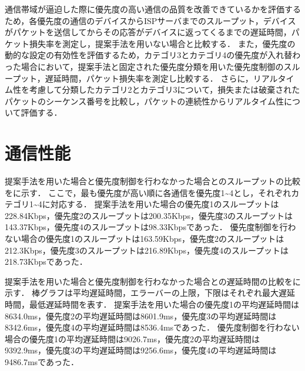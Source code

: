 \documentclass[a4paper,11pt,uplatex]{ujreport}
\begin{document}
  通信帯域が逼迫した際に優先度の高い通信の品質を改善できているかを評価するため，各優先度の通信のデバイスからISPサーバまでのスループット，デバイスがパケットを送信してからその応答がデバイスに返ってくるまでの遅延時間，パケット損失率を測定し，提案手法を用いない場合と比較する．
  また，優先度の動的な設定の有効性を評価するため，カテゴリ3とカテゴリ4の優先度が入れ替わった場合において，提案手法と固定された優先度分類を用いた優先度制御のスループット，遅延時間，パケット損失率を測定し比較する．
  さらに，リアルタイム性を考慮して分類したカテゴリ2とカテゴリ3について，損失または破棄されたパケットのシーケンス番号を比較し，パケットの連続性からリアルタイム性について評価する．

\section{通信性能}
\label{sec:通信性能}

  提案手法を用いた場合と優先度制御を行わなかった場合とのスループットの比較をに示す．
  ここで，最も優先度が高い順に各通信を優先度1\textasciitilde4とし，それぞれカテゴリ1\textasciitilde4に対応する．
  提案手法を用いた場合の優先度1のスループットは228.84Kbps，優先度2のスループットは200.35Kbps，優先度3のスループットは143.37Kbps，優先度4のスループットは98.33Kbpsであった．
  優先度制御を行わない場合の優先度1のスループットは163.59Kbps，優先度2のスループットは212.3Kbps，優先度3のスループットは216.89Kbps，優先度4のスループットは218.73Kbpsであった．


  提案手法を用いた場合と優先度制御を行わなかった場合との遅延時間の比較をに示す．
  棒グラフは平均遅延時間，エラーバーの上限，下限はそれぞれ最大遅延時間，最低遅延時間を表す．
  提案手法を用いた場合の優先度1の平均遅延時間は8634.0ms，優先度2の平均遅延時間は8601.9ms，優先度3の平均遅延時間は8342.6ms，優先度4の平均遅延時間は8536.4msであった．
  優先度制御を行わない場合の優先度1の平均遅延時間は9026.7ms，優先度2の平均遅延時間は9392.9ms，優先度3の平均遅延時間は9256.6ms，優先度4の平均遅延時間は9486.7msであった．

\end{document}
